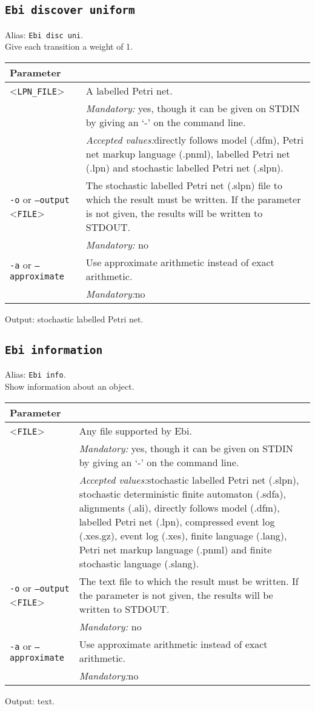 {\subsection{\texttt{Ebi discover uniform}}
\label{command:Ebi discover uniform}
Alias: \texttt{Ebi disc uni}.\\
Give each transition a weight of 1.\\
\begin{tabularx}{\linewidth}{lX}
\toprule
Parameter \\\midrule
<\texttt{LPN\_FILE}>&A labelled Petri net.\\
&\textit{Mandatory:} \quad yes, though it can be given on STDIN by giving an `-' on the command line.\\
&\textit{Accepted values:}\quad directly follows model (.dfm), Petri net markup language (.pnml), labelled Petri net (.lpn) and stochastic labelled Petri net (.slpn).\\
\texttt{-o} or \texttt{--output} <\texttt{FILE}> &
The stochastic labelled Petri net (.slpn) file to which the result must be written. If the parameter is not given, the results will be written to STDOUT.\\
&\textit{Mandatory:} \quad no\\
\texttt{-a} or \texttt{--approximate} & Use approximate arithmetic instead of exact arithmetic.\\
&\textit{Mandatory:}\quad no\\
\bottomrule
\end{tabularx}
Output: stochastic labelled Petri net.
\subsection{\texttt{Ebi information}}
\label{command:Ebi information}
Alias: \texttt{Ebi info}.\\
Show information about an object.\\
\begin{tabularx}{\linewidth}{lX}
\toprule
Parameter \\\midrule
<\texttt{FILE}>&Any file supported by Ebi.\\
&\textit{Mandatory:} \quad yes, though it can be given on STDIN by giving an `-' on the command line.\\
&\textit{Accepted values:}\quad stochastic labelled Petri net (.slpn), stochastic deterministic finite automaton (.sdfa), alignments (.ali), directly follows model (.dfm), labelled Petri net (.lpn), compressed event log (.xes.gz), event log (.xes), finite language (.lang), Petri net markup language (.pnml) and finite stochastic language (.slang).\\
\texttt{-o} or \texttt{--output} <\texttt{FILE}> &
The text file to which the result must be written. If the parameter is not given, the results will be written to STDOUT.\\
&\textit{Mandatory:} \quad no\\
\texttt{-a} or \texttt{--approximate} & Use approximate arithmetic instead of exact arithmetic.\\
&\textit{Mandatory:}\quad no\\
\bottomrule
\end{tabularx}
Output: text.
}

